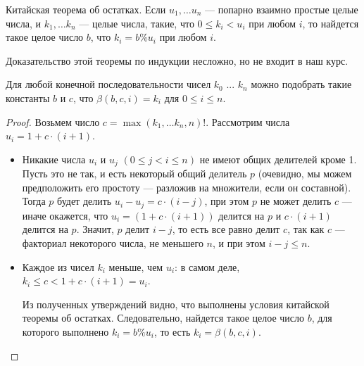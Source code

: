 \begin{theorem}Китайская теорема об остатках.
Если $u_1, \dots u_n$ --- попарно взаимно простые целые числа,
и $k_1, \dots k_n$ --- целые числа, такие, что $0 \le k_i < u_i$
при любом $i$, то найдется такое целое число $b$, что
$k_i = b \% u_i$ при любом $i$.
\end{theorem}

Доказательство этой теоремы по индукции несложно, но не входит в наш курс. 

\begin{lemma} 
Для любой конечной последовательности чисел $k_0$ ... $k_n$ можно подобрать
такие константы $b$ и $c$, что $\beta (b,c,i) = k_i$ для $0 \le i \le n$.
\end{lemma}

\begin{proof}
Возьмем число $c = \max(k_1,\dots k_n,n)!$. Рассмотрим числа $u_i = 1 + c \cdot (i+1)$. 

\begin{itemize}

\item Никакие числа $u_i$ и $u_j$ $(0 \le j < i \le n)$ не имеют общих делителей кроме 1.
Пусть это не так, и есть некоторый общий делитель $p$ (очевидно, мы можем предположить его
простоту --- разложив на множители, если он составной).
Тогда $p$ будет делить $u_i - u_j = c \cdot (i - j)$,
при этом $p$ не может делить $c$ --- иначе окажется, что $u_i = (1 + c \cdot (i+1))$ делится на $p$
и $c \cdot (i+1)$ делится на $p$. Значит, $p$ делит $i-j$, то есть все равно делит $c$, так как
$c$ --- факториал некоторого числа, не меньшего $n$, и при этом $i-j \le n$.

\item Каждое из чисел $k_i$ меньше, чем $u_i$: в самом деле, $k_i \le c < 1 + c \cdot (i+1) = u_i$.

Из полученных утверждений видно, что выполнены условия китайской 
теоремы об остатках.
Следовательно, найдется такое целое число $b$, для которого 
выполнено $k_i = b \% u_i$, то есть $k_i = \beta (b,c,i)$.
\end{itemize}
\end{proof}


